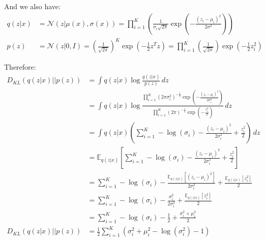 \documentclass{article}
\begin{document}
And we also have:
\begin{equation}
  \begin{split}
    q(z|x) & = \mathcal{N}(z|\mu(x), \sigma(x)) = \prod_{i=1}^{K}\left(\frac{1}{\sigma_i\sqrt{2\pi}} \exp\left(-\frac{(z_i - \mu_i)^2}{2\sigma^2}\right)\right)                                    \\
    p(z)   & = \mathcal{N}(z|0, I) = \left(\frac{1}{\sqrt{2\pi}}\right)^K \exp\left(-\frac{1}{2}z^Tz\right) = \prod_{i=1}^{K}\left(\frac{1}{\sqrt{2\pi}}\right) \exp\left(-\frac{1}{2}z_i^2\right)
  \end{split}
\end{equation}

Therefore:
\begin{equation}
  \begin{split}
    D_{KL} \left(q(z|x) \lvert\rvert p(z)\right) & = \int q(z|x) \log \frac{q(z|x)}{p(z)} \,dz                                                                                                                                                                                         \\
                                                 & = \int q(z|x) \log \frac{\prod_{i=1}^{K} \left(2\pi\sigma_i^2\right)^{-\frac{1}{2}} \exp\left(-\frac{(z_i - \mu_i)^2}{2\sigma_i^2}\right)}{\prod_{i=1}^{K} \left(2\pi\right)^{-\frac{1}{2}} \exp\left(-\frac{z_i^2}{2}\right)} \,dz \\
                                                 & = \int q(z|x)  \left(\sum_{i=1}^{K} -\log (\sigma_i) - \frac{(z_i - \mu_i)^2}{2\sigma_i^2} + \frac{z_i^2}{2}\right) \,dz                                                                                                            \\
                                                 & = \mathbb{E}_{q(z|x)}\left[\sum_{i=1}^{K} -\log (\sigma_i) - \frac{(z_i - \mu_i)^2}{2\sigma_i^2} + \frac{z_i^2}{2}\right]                                                                                                           \\
                                                 & = \sum_{i=1}^{K} -\log(\sigma_i) - \frac{\mathbb{E}_{q(z|x)}\left[(z_i - \mu_i)^2\right]}{2\sigma_i^2} + \frac{\mathbb{E}_{q(z|x)}\left[z_i^2\right]}{2}                                                                            \\
                                                 & = \sum_{i=1}^{K} -\log(\sigma_i) - \frac{\sigma_i^2}{2\sigma_i^2} + \frac{\mathbb{E}_{q(z|x)}[z_i^2]}{2}                                                                                                                            \\
                                                 & = \sum_{i=1}^{K} -\log(\sigma_i) - \frac{1}{2} + \frac{\sigma_i^2 + \mu_i^2}{2}                                                                                                                                                     \\
    D_{KL} \left(q(z|x) \lvert\rvert p(z)\right) & = \frac{1}{2} \sum_{i=1}^{K} \left(\sigma_i^2 + \mu_i^2 - \log(\sigma_i^2) - 1\right)
  \end{split}
\end{equation}
\end{document}
